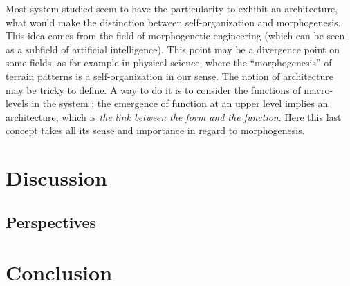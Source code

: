 \documentclass{article}
\begin{document}
Most system studied seem to have the particularity to exhibit an architecture, what would make the distinction between self-organization and morphogenesis. This idea comes from the field of morphogenetic engineering (which can be seen as a subfield of artificial intelligence). This point may be a divergence point on some fields, as for example in physical science, where the ``morphogenesis'' of terrain patterns is a self-organization in our sense. The notion of architecture may be tricky to define. A way to do it is to consider the functions of macro-levels in the system : the emergence of function at an upper level implies an architecture, which is \emph{the link between the form and the function}. Here this last concept takes all its sense and importance in regard to morphogenesis.





\section{Discussion}

\subsection{Perspectives}





\section{Conclusion}





















\end{document}
